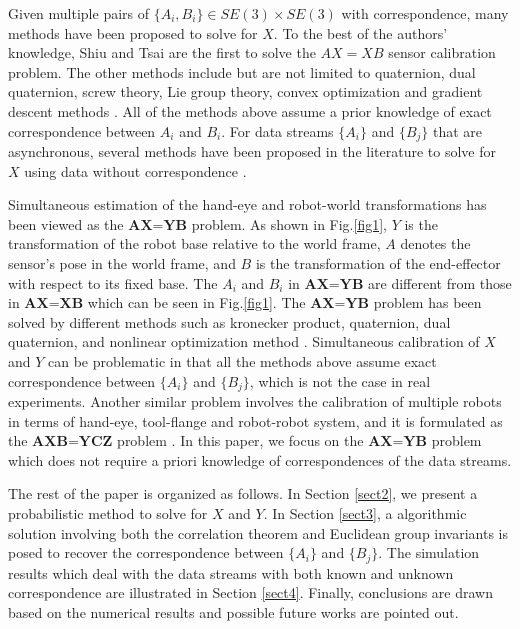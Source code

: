 \documentclass[conference,letterpaper]{IEEEtran}
\begin{document}
Given multiple pairs of $\{A_{i},B_{i}\} \in SE(3) \times SE(3)$ with correspondence, many methods have been proposed to solve for $X$. To the best of the authors' knowledge, Shiu\cite{Shiu1989} and Tsai\cite{Tsai1989} are the first to solve the $AX=XB$ sensor calibration problem. The other methods include but are not limited to quaternion, dual quaternion, screw theory, Lie group theory, convex optimization and gradient descent methods \cite{Wang1992,Park1994,Horaud1995,Daniilidis1999,Fassi2005,Zhao2011,Ackerman2014a}. All of the methods above assume a prior knowledge of exact correspondence  between $A_{i}$ and $B_{i}$. For data streams $\{A_{i}\}$ and $\{B_{j}\}$ that are asynchronous, several methods have been proposed in the literature to solve for $X$ using data without correspondence \cite{Ackerman2013a,Ackerman2013,Ackerman2014}.

Simultaneous estimation of the hand-eye and robot-world transformations
has been viewed as the $\textbf{AX=YB}$ problem. As shown in Fig.\ref{fig1}, $Y$ is the transformation of the robot base relative to the world frame, $A$ denotes the sensor's pose in the world frame, and $B$ is the transformation of  the end-effector with respect to its fixed base. The $A_{i}$ and $B_{i}$ in $\textbf{AX=YB}$ are different from those in $\textbf{AX=XB}$ which can be seen in Fig.\ref{fig1}. The $\textbf{AX=YB}$ problem has been solved by different methods such as kronecker product, quaternion, dual quaternion, and nonlinear optimization method \cite{Zhuang1994,dornaika1998simultaneous,Hirsh2001, ernst2012non,strobl2006optimal,Li2010,Shah2013,Heller2014}. Simultaneous calibration of $X$ and $Y$ can be problematic in that all the methods above assume exact correspondence between $\{A_{i}\}$ and $\{B_{j}\}$, which is not the case in real experiments. Another similar problem involves the calibration of multiple robots in terms of hand-eye, tool-flange and robot-robot system, and it is formulated as the $\textbf{AXB=YCZ}$ problem \cite{Wang2014}. In this paper, we focus on the $\textbf{AX=YB}$ problem which does not require a priori knowledge of correspondences of the data streams.

The rest of the paper is organized as follows. In Section
\ref{sect2}, we present a probabilistic method to solve for $X$ and $Y$. In Section \ref{sect3}, a algorithmic solution involving both the correlation theorem and Euclidean group invariants is posed to recover the correspondence between $\{A_{i}\}$ and $\{B_{j}\}$. The simulation results which deal with the data streams with both known and unknown correspondence are illustrated in Section \ref{sect4}. Finally, conclusions are drawn based on the numerical results and possible future works are pointed out.
\end{document}
